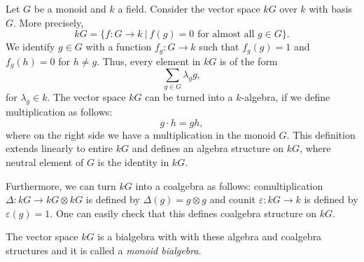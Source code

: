 \documentclass[12pt]{article}
\begin{document}
Let $G$ be a monoid and $k$ a field. Consider the vector space $kG$ over $k$ with basis $G$. More precisely,
$$kG=\{f:G\to k\ |\ f(g)=0 \mbox{ for almost all }g\in G\}.$$
We identify $g\in G$ with a function $f_g:G\to k$ such that $f_g(g)=1$ and $f_g(h)=0$ for $h\neq g$. Thus, every element in $kG$ is of the form 
$$\sum_{g\in G}\lambda_g g,$$
for $\lambda_g\in k$. The vector space $kG$ can be turned into a $k$-algebra, if we define multiplication as follows:
$$g\cdot h=gh,$$
where on the right side we have a multiplication in the monoid $G$. This definition extends linearly to entire $kG$ and defines an algebra structure on $kG$, where neutral element of $G$ is the identity in $kG$.

Furthermore, we can turn $kG$ into a coalgebra as follows: comultiplication $\Delta:kG\to kG\otimes kG$ is defined by $\Delta(g)=g\otimes g$ and counit $\varepsilon:kG\to k$ is defined by $\varepsilon(g)=1$. One can easily check that this defines coalgebra structure on $kG$.

The vector space $kG$ is a bialgebra with with these algebra and coalgebra structures and it is called a \textit{monoid bialgebra}.
\end{document}

